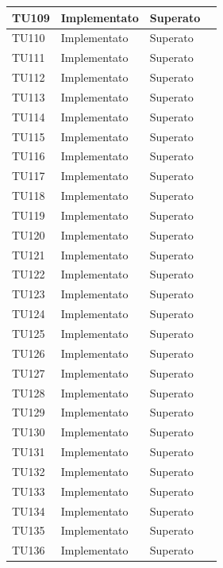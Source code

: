 \begin{longtable}{|>{\centering\arraybackslash}m{1.6cm}|>{\centering\arraybackslash}m{6.41cm}|>{\centering\arraybackslash}m{3.1cm}| c |}
		\rowcolor{LightGray}
	TU109 & Implementato & Superato  \\ \hline
	TU110 & Implementato & Superato  \\ \hline
		\rowcolor{LightGray}
	TU111 & Implementato & Superato  \\ \hline
	TU112 & Implementato & Superato  \\ \hline
		\rowcolor{LightGray}
	TU113 & Implementato & Superato  \\ \hline
	TU114 & Implementato & Superato  \\ \hline
		\rowcolor{LightGray}
	TU115 & Implementato & Superato  \\ \hline
	TU116 & Implementato & Superato  \\ \hline
		\rowcolor{LightGray}
	TU117 & Implementato & Superato  \\ \hline
	TU118 & Implementato & Superato  \\ \hline
		\rowcolor{LightGray}
	TU119 & Implementato & Superato  \\ \hline
	TU120 & Implementato & Superato  \\ \hline
		\rowcolor{LightGray}
	TU121 & Implementato & Superato  \\ \hline
	TU122 & Implementato & Superato  \\ \hline
		\rowcolor{LightGray}
	TU123 & Implementato & Superato  \\ \hline
	TU124 & Implementato & Superato  \\ \hline
		\rowcolor{LightGray}
	TU125 & Implementato & Superato  \\ \hline
	TU126 & Implementato & Superato  \\ \hline
		\rowcolor{LightGray}
	TU127 & Implementato & Superato  \\ \hline
	TU128 & Implementato & Superato  \\ \hline
		\rowcolor{LightGray}
	TU129 & Implementato & Superato  \\ \hline
	TU130 & Implementato & Superato  \\ \hline
		\rowcolor{LightGray}
	TU131 & Implementato & Superato  \\ \hline
	TU132 & Implementato & Superato  \\ \hline
		\rowcolor{LightGray}
	TU133 & Implementato & Superato  \\ \hline
	TU134 & Implementato & Superato  \\ \hline
	\rowcolor{LightGray}
	TU135 & Implementato & Superato  \\ \hline
	TU136 & Implementato & Superato  \\ \hline

\end{longtable}

